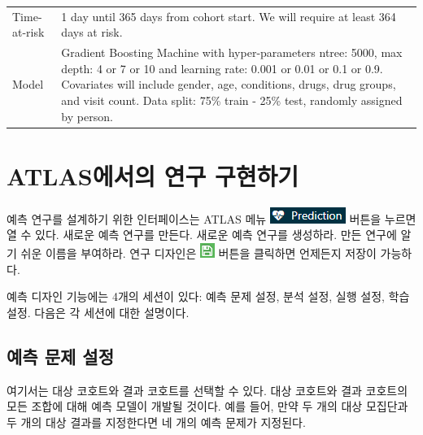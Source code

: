 \documentclass[10.5pt]{book}
\theoremstyle{definition}
\theoremstyle{definition}
\theoremstyle{definition}
\theoremstyle{remark}
\begin{document}
\begin{longtable}[]{@{}ll@{}}
\begin{minipage}[t]{0.23\columnwidth}
Time-at-risk\strut
\end{minipage} & \begin{minipage}[t]{0.71\columnwidth}\raggedright\strut
1 day until 365 days from cohort start. We will require at least 364
days at risk.\strut
\end{minipage}\tabularnewline
\begin{minipage}[t]{0.23\columnwidth}\raggedright\strut
Model\strut
\end{minipage} & \begin{minipage}[t]{0.71\columnwidth}\raggedright\strut
Gradient Boosting Machine with hyper-parameters ntree: 5000, max depth:
4 or 7 or 10 and learning rate: 0.001 or 0.01 or 0.1 or 0.9. Covariates
will include gender, age, conditions, drugs, drug groups, and visit
count. Data split: 75\% train - 25\% test, randomly assigned by
person.\strut
\end{minipage}\tabularnewline
\bottomrule
\end{longtable}

\section{ATLAS에서의 연구 구현하기}\label{atlas--}

예측 연구를 설계하기 위한 인터페이스는 ATLAS 메뉴
\includegraphics{images/PatientLevelPrediction/predictionButton.png}
버튼을 누르면 열 수 있다. 새로운 예측 연구를 만든다. 새로운 예측 연구를
생성하라. 만든 연구에 알기 쉬운 이름을 부여하라. 연구 디자인은
\includegraphics{images/PopulationLevelEstimation/save.png} 버튼을
클릭하면 언제든지 저장이 가능하다. 

예측 디자인 기능에는 4개의 세션이 있다: 예측 문제 설정, 분석 설정, 실행
설정, 학습 설정. 다음은 각 세션에 대한 설명이다.

\subsection{예측 문제 설정}\label{--}

여기서는 대상 코호트와 결과 코호트를 선택할 수 있다. 대상 코호트와 결과
코호트의 모든 조합에 대해 예측 모델이 개발될 것이다. 예를 들어, 만약 두
개의 대상 모집단과 두 개의 대상 결과를 지정한다면 네 개의 예측 문제가
지정된다.
\end{document}
